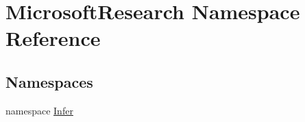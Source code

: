 \hypertarget{namespace_microsoft_research}{}\section{Microsoft\+Research Namespace Reference}
\label{namespace_microsoft_research}
\subsection*{Namespaces}
\begin{DoxyCompactItemize}
\item 
namespace \hyperlink{namespace_microsoft_research_1_1_infer}{Infer}
\end{DoxyCompactItemize}
